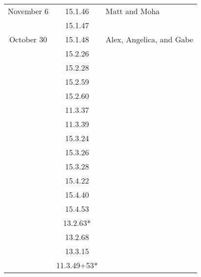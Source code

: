 \documentclass[12pt]{amsart}
\begin{document}
\begin{longtable}{c|c|l}
        November 6      & 15.1.46                              & Matt and Moha                            \\
                        & 15.1.47                              &                                          \\
        October 30      & 15.1.48                              & Alex, Angelica, and Gabe                 \\
                        & 15.2.26                              &                                          \\
                        & 15.2.28                              &                                          \\
                        & 15.2.59                              &                                          \\
                        & 15.2.60                              &                                          \\
                        & 11.3.37                              &                                          \\
                        & 11.3.39                              &                                          \\
                        & 15.3.24                              &                                          \\
                        & 15.3.26                              &                                          \\
                        & 15.3.28                              &                                          \\
                        & 15.4.22                              &                                          \\
                        & 15.4.40                              &                                          \\
                        & 15.4.53                              &                                          \\
                        & 13.2.63*                             &                                          \\
                        & 13.2.68                              &                                          \\
                        & 13.3.15                              &                                          \\
                        & 11.3.49+53*                          &                                          
    \end{longtable}
\end{document}

